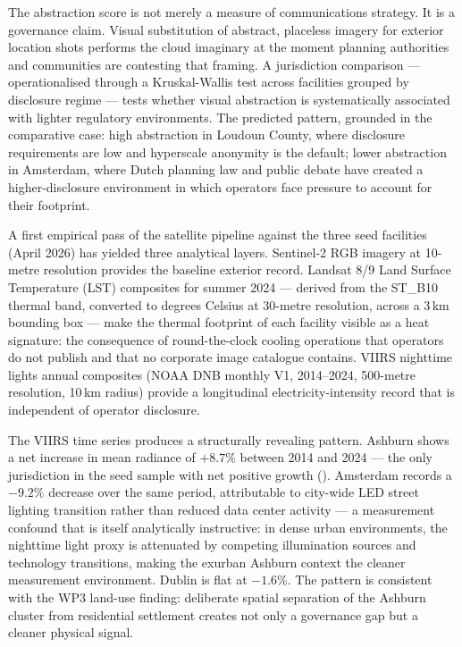 The abstraction score is not merely a measure of communications strategy. It is a governance claim. Visual substitution of abstract, placeless imagery for exterior location shots performs the cloud imaginary at the moment planning authorities and communities are contesting that framing. A jurisdiction comparison — operationalised through a Kruskal-Wallis test across facilities grouped by disclosure regime — tests whether visual abstraction is systematically associated with lighter regulatory environments. The predicted pattern, grounded in the comparative case: high abstraction in Loudoun County, where disclosure requirements are low and hyperscale anonymity is the default; lower abstraction in Amsterdam, where Dutch planning law and public debate have created a higher-disclosure environment in which operators face pressure to account for their footprint.

A first empirical pass of the satellite pipeline against the three seed facilities (April 2026) has yielded three analytical layers. Sentinel-2 RGB imagery at 10-metre resolution provides the baseline exterior record. Landsat 8/9 Land Surface Temperature (LST) composites for summer 2024 — derived from the ST\_B10 thermal band, converted to degrees Celsius at 30-metre resolution, across a 3\,km bounding box — make the thermal footprint of each facility visible as a heat signature: the consequence of round-the-clock cooling operations that operators do not publish and that no corporate image catalogue contains. VIIRS nighttime lights annual composites (NOAA DNB monthly V1, 2014--2024, 500-metre resolution, 10\,km radius) provide a longitudinal electricity-intensity record that is independent of operator disclosure.

The VIIRS time series produces a structurally revealing pattern. Ashburn shows a net increase in mean radiance of $+8.7\%$ between 2014 and 2024 --- the only jurisdiction in the seed sample with net positive growth (). Amsterdam records a $-9.2\%$ decrease over the same period, attributable to city-wide LED street lighting transition rather than reduced data center activity --- a measurement confound that is itself analytically instructive: in dense urban environments, the nighttime light proxy is attenuated by competing illumination sources and technology transitions, making the exurban Ashburn context the cleaner measurement environment. Dublin is flat at $-1.6\%$. The pattern is consistent with the WP3 land-use finding: deliberate spatial separation of the Ashburn cluster from residential settlement creates not only a governance gap but a cleaner physical signal.

